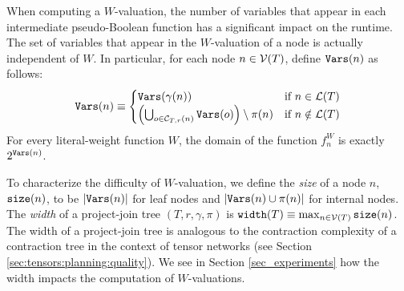 When computing a $W$-valuation, the number of variables that appear in each intermediate pseudo-Boolean function has a significant impact on the runtime.
The set of variables that appear in the $W$-valuation of a node is actually independent of $W$.
In particular, for each node $n \in \mathcal{V}(T)$, define $\texttt{\upshape Vars}(n)$ as follows:
\begin{equation}
    \texttt{\upshape Vars}(n) \equiv
    \begin{cases}
        \texttt{\upshape Vars}(\gamma(n)) & \text{if}~n \in \mathcal{L}(T) \\
        \left( \bigcup_{o \in \mathcal{C}_{T,r}(n)} \texttt{\upshape Vars}(o) \right) \setminus \pi(n) & \text{if}~n \notin \mathcal{L}(T)
    \end{cases}
\end{equation}
For every literal-weight function $W$, the domain of the function $f^W_n$ is exactly $2^{\texttt{\upshape Vars}(n)}$.

To characterize the difficulty of $W$-valuation, we define the \emph{size} of a node $n$, $\texttt{\upshape size}(n)$, to be $\left| \texttt{\upshape Vars}(n) \right|$ for leaf nodes and $\left| \texttt{\upshape Vars}(n) \cup \pi(n) \right|$ for internal nodes.
The \emph{width} of a project-join tree $(T, r, \gamma, \pi)$ is $\texttt{\upshape width}(T) \equiv \max_{n \in \mathcal{V}(T)} \texttt{\upshape size}(n)$.
The width of a project-join tree is analogous to the contraction complexity of a contraction tree in the context of tensor networks (see Section \ref{sec:tensors:planning:quality}).
We see in Section \ref{sec_experiments} how the width impacts the computation of $W$-valuations.





